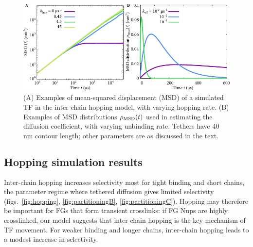 \begin{figure}[h!]
\centering
\includegraphics[width=0.7\linewidth]{figs/ch02/integrand-example-plots.pdf}
\caption{(A) Examples of mean-squared displacement (MSD) of a simulated TF in the inter-chain hopping model, with varying hopping rate.  (B) Examples of MSD distributions $\rho_{\mathrm{MSD}} (t)$ used in estimating the diffusion coefficient, with varying unbinding rate. Tethers have 40 nm contour length; other parameters are as discussed in the text.}
\label{fig:integrand}
\end{figure}

\subsection{Hopping simulation results}
Inter-chain hopping increases selectivity most for tight binding and short chains, the parameter regime where tethered diffusion gives limited selectivity (figs.~\ref{fig:hopping}, \ref{fig:partitioningB}, \ref{fig:partitioningC}). Hopping may therefore be important for FGs that form transient crosslinks: if FG Nups are highly crosslinked, our model suggests that inter-chain hopping is the key mechanism of TF movement.  For weaker binding and longer chains, inter-chain hopping leads to a modest increase in selectivity.

